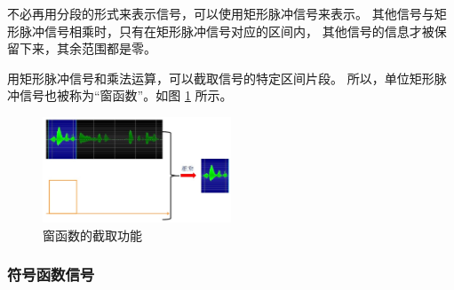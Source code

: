 \begin{remark}
    不必再用分段的形式来表示信号，可以使用矩形脉冲信号来表示。
    其他信号与矩形脉冲信号相乘时，只有在矩形脉冲信号对应的区间内，
    其他信号的信息才被保留下来，其余范围都是零。

    用矩形脉冲信号和乘法运算，可以截取信号的特定区间片段。
    所以，单位矩形脉冲信号也被称为``窗函数''。如图 \ref{fig:rectangular-pulse-signal-example} 所示。
    \begin{figure}[H]
        \centering
        \includegraphics[width=0.5\textwidth]{chap1/img/rectangular-pulse-signal-example.png}
        \caption{窗函数的截取功能}
        \label{fig:rectangular-pulse-signal-example}
    \end{figure}
\end{remark}

\subsubsection{符号函数信号}

